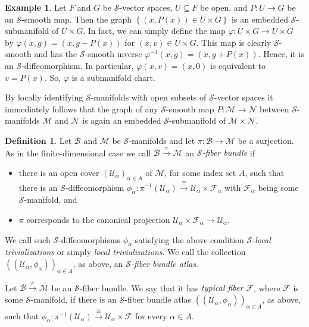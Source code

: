 \documentclass[12pt,a4paper]{article}
\theoremstyle{plain}
\theoremstyle{definition}
\newtheorem{definition}[theorem]{Definition}
\newtheorem{example}[theorem]{Example}
\newcommand{\Mcal}{\mathcal{M}}
\newcommand{\Ncal}{\mathcal{N}}
\newcommand{\Scal}{\mathcal{S}}
\newcommand{\Ucal}{\mathcal{U}}
\begin{document}
\begin{example}
\label{Ex:GraphSubmfd}
Let $F$ and $G$ be $\Scal$-vector spaces, $U\subseteq F$ be open, and
$P:U\to G$ be an $\Scal$-smooth map. Then the graph $\left\{(x,P(x))\in U \times G\right\}$ is an embedded $\Scal$-submanifold of $U\times G$. In fact, we can simply define the map 
$\varphi:U\times G\to U\times G$ by $\varphi(x,g)=(x,g-P(x))$ for $(x,v)\in U\times G$. This map is clearly $\Scal$-smooth and has the $\Scal$-smooth inverse $\varphi^{-1}(x,g)=(x,g+P(x))$. Hence, it is an $\Scal$-diffeomorphism. In particular, $\varphi(x,v)=(x,0)$ is equivalent to $v=P(x)$. So, $\varphi$ is a submanifold chart.

By locally identifying $\Scal$-manifolds with open subsets of $\Scal$-vector spaces it immediately follows that the graph of any $\Scal$-smooth map $P:\Mcal\to \Ncal$ between $\Scal$-manifolds $\Mcal$ and $\Ncal$ is again an embedded $\Scal$-submanifold of $\Mcal\times \Ncal$.
\end{example}







\begin{definition}
Let $\mathcal{B}$ and $\Mcal$ be $\Scal$-manifolds and let $\pi:\mathcal B\to \Mcal$ be a surjection. As in the finite-dimensional case we call $\mathcal{B}\xrightarrow{\pi}\Mcal$ an \textit{$\Scal$-fiber bundle} if
\begin{itemize}
    \item there is an open cover $(\Ucal_\alpha)_{\alpha \in A}$ of $\Mcal$, for some index set $A$, such that there is an $\Scal$-diffeomorphism $\phi_\alpha:\pi^{-1}(\Ucal_\alpha)\xrightarrow{\cong}\Ucal_\alpha \times \mathcal F_\alpha$ with $\mathcal F_\alpha$ being some $\Scal$-manifold, and
    \item $\pi$ corresponds to the canonical projection $\Ucal_\alpha \times \mathcal{F}_\alpha\to \Ucal_\alpha$.
\end{itemize}
We call such $\Scal$-diffeomorphisms $\phi_\alpha$ satisfying the above condition \textit{$\Scal$-local trivializations} or simply \textit{local trivializations}. We call the collection $((\Ucal_\alpha, \phi_\alpha))_{\alpha\in A}$, as above, an \textit{$\Scal$-fiber bundle atlas}. 

Let $\mathcal B\xrightarrow{\pi} \Mcal$ be an $\Scal$-fiber bundle. We say that it has \textit{typical fiber $\mathcal{F}$}, where $\mathcal F$ is some $\Scal$-manifold, if there is an $\Scal$-fiber bundle atlas $((\Ucal_\alpha,\phi_\alpha))_{\alpha\in A}$, as above, such that $\phi_\alpha:\pi^{-1}(\Ucal_\alpha)\xrightarrow{\cong} \Ucal_\alpha\times \mathcal F$ for every $\alpha\in A$.
\end{definition}
\end{document}
